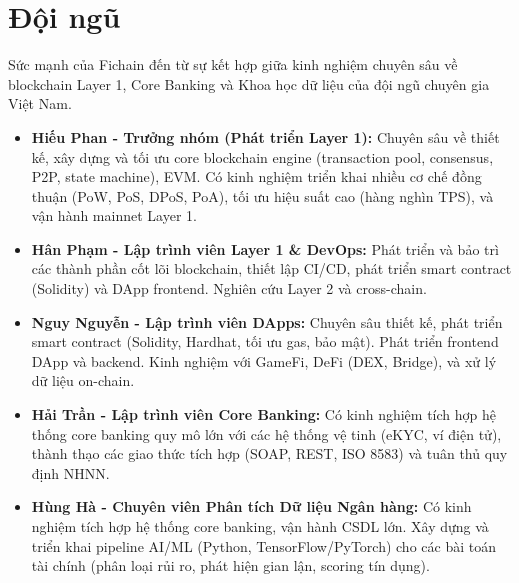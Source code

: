 \section{Đội ngũ}
Sức mạnh của Fichain đến từ sự kết hợp giữa kinh nghiệm chuyên sâu về blockchain Layer 1, Core Banking và Khoa học dữ liệu của đội ngũ chuyên gia Việt Nam.

\begin{itemize}
    \item \textbf{Hiếu Phan - Trưởng nhóm (Phát triển Layer 1):} 
    Chuyên sâu về thiết kế, xây dựng và tối ưu core blockchain engine (transaction pool, consensus, P2P, state machine), EVM. Có kinh nghiệm triển khai nhiều cơ chế đồng thuận (PoW, PoS, DPoS, PoA), tối ưu hiệu suất cao (hàng nghìn TPS), và vận hành mainnet Layer 1.

    \item \textbf{Hân Phạm - Lập trình viên Layer 1 \& DevOps:} 
    Phát triển và bảo trì các thành phần cốt lõi blockchain, thiết lập CI/CD, phát triển smart contract (Solidity) và DApp frontend. Nghiên cứu Layer 2 và cross-chain.

    \item \textbf{Nguy Nguyễn - Lập trình viên DApps:} 
    Chuyên sâu thiết kế, phát triển smart contract (Solidity, Hardhat, tối ưu gas, bảo mật). Phát triển frontend DApp và backend. Kinh nghiệm với GameFi, DeFi (DEX, Bridge), và xử lý dữ liệu on-chain.

    \item \textbf{Hải Trần - Lập trình viên Core Banking:} 
    Có kinh nghiệm tích hợp hệ thống core banking quy mô lớn với các hệ thống vệ tinh (eKYC, ví điện tử), thành thạo các giao thức tích hợp (SOAP, REST, ISO 8583) và tuân thủ quy định NHNN.

    \item \textbf{Hùng Hà - Chuyên viên Phân tích Dữ liệu Ngân hàng:} 
    Có kinh nghiệm tích hợp hệ thống core banking, vận hành CSDL lớn. Xây dựng và triển khai pipeline AI/ML (Python, TensorFlow/PyTorch) cho các bài toán tài chính (phân loại rủi ro, phát hiện gian lận, scoring tín dụng).

\end{itemize}
